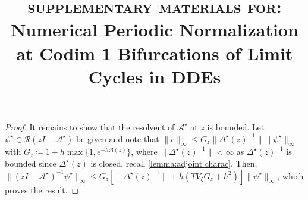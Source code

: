 \documentclass[english]{myarticle}
\newcommand{\TheTitle}{Numerical Periodic Normalization at Codim 1 Bifurcations of Limit Cycles in DDEs}
\begin{document}
\begin{sloppypar}
\begin{proof}
It remains to show that the resolvent of $\mathcal{A}^\star$ at $z$ is bounded. Let $\psi^\star \in \mathcal{R}(zI - \mathcal{A}^\star)$ be given and note that $\| c \|_\infty \leq G_z \| \Delta^\star(z)^{-1} \| \|\psi^\star\|_\infty$ with $G_z \coloneqq 1 + h \max \{1,e^{-h \Re(z)} \}$, where $\| \Delta^\star(z)^{-1} \| < \infty$ as $\Delta^\star(z)^{-1}$ is bounded since $\Delta^\star(z)$ is closed, recall \cref{lemma:adjoint charac}. Then, $\|(zI - \mathcal{A}^\star)^{-1}\psi^\star \|_\infty \leq G_z[\| \Delta^\star(z)^{-1} \| + h (TV_\zeta G_z + h^2)] \|\psi^\star\|_\infty$, which proves the result.
\end{proof}
\end{sloppypar}

\label{mysupplement}
\begin{mytitle}
  \title{\textsc{supplementary materials for:}\\ \TheTitle}
  \maketitle
\end{mytitle}
\thispagestyle{plain}

\ResetCounters
\end{document}
